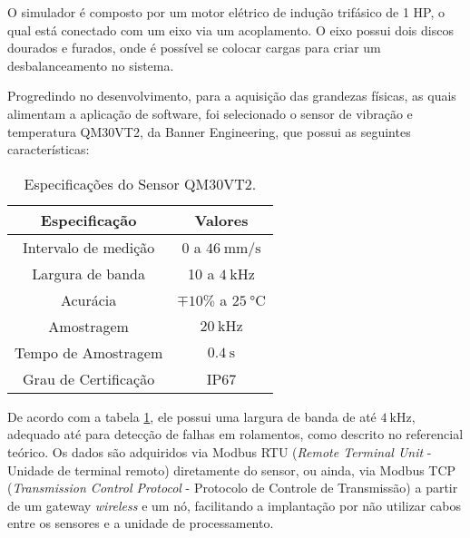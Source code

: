 \documentclass[a4paper]{ifacconf}
\begin{document}
O simulador é composto por um motor elétrico de indução trifásico de 1 HP, o qual está conectado com um eixo via um 
acoplamento. O eixo possui dois discos dourados e furados, onde é possível se colocar cargas para criar um desbalanceamento no sistema.

Progredindo no desenvolvimento, para a aquisição das grandezas físicas, as quais alimentam a aplicação de software, foi selecionado o sensor 
de vibração e temperatura QM30VT2\textsuperscript\textregistered, da Banner Engineering\textsuperscript\textregistered, que possui as seguintes características:

\begin{table}[H]
  \caption{Especificações do Sensor QM30VT2\textsuperscript\textregistered.}
  \label{tab:espec_sensor}
  \centering
  \begin{minipage}{.33\textwidth}
    \begin{tabular*}{\textwidth}{c|c}
      \hline
      Especificação            & Valores                                     \\ \hline
      \hline
      Intervalo de medição     &  0 a $\SI{46}{\milli\metre\per\second}$     \\
      Largura de banda         &  10 a $\SI{4}{\kilo\hertz}$                 \\ 
      Acurácia                 &  $\mp 10 \%$ a $\SI{25}{\celsius}$          \\
      Amostragem               &  $\SI{20}{\kilo\hertz}$                     \\
      Tempo de Amostragem      &  $\SI{0.4}{\second}$                        \\
      Grau de Certificação     &  IP67                                       \\ \hline
    \end{tabular*}
  \end{minipage}
\end{table}

De acordo com a tabela \ref{tab:espec_sensor}, ele possui uma largura de banda de até $\SI{4}{\kilo\hertz}$, adequado até para detecção de falhas em rolamentos, como 
descrito no referencial teórico. Os dados são adquiridos via Modbus RTU (\textit{Remote Terminal Unit} - Unidade de terminal remoto) diretamente
do sensor, ou ainda, via Modbus TCP (\textit{Transmission Control Protocol} - Protocolo de Controle de Transmissão) a partir de um gateway
\textit{wireless} e um nó, facilitando a implantação por não utilizar cabos entre os sensores e a unidade de processamento. 
\end{document}

